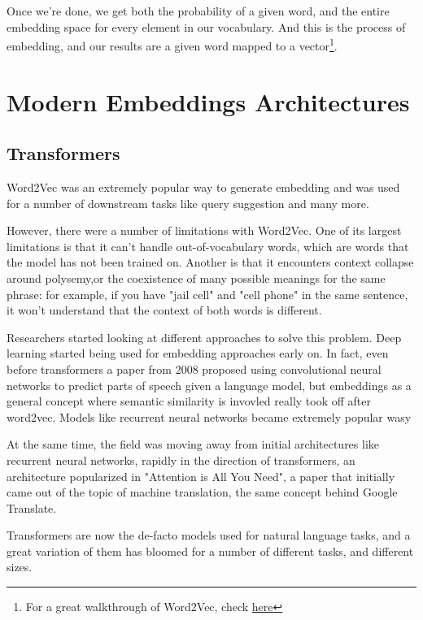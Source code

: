 \documentclass[draft, 11pt]{diazessay} %
\begin{document}
Once we're done, we get both the probability of a given word, and the entire embedding space for every element in our vocabulary. And this is the process of embedding, and our results are a given word mapped to a vector\footnote{For a great walkthrough of Word2Vec, check  \href{https://jalammar.github.io/illustrated-word2vec/}{here}}. 

\section{Modern Embeddings Architectures}

\subsection{Transformers}

Word2Vec was an extremely popular way to generate embedding and was used for a number of downstream tasks like query suggestion
\citep{gabin2023keyword} and many more. 

However, there were a number of limitations with Word2Vec. One of its largest limitations is that it can't handle out-of-vocabulary words, which are words that the model has not been trained on.  Another is that it encounters context collapse around polysemy,or the coexistence of many possible meanings for the same phrase: for example, if you have "jail cell" and "cell phone" in the same sentence, it won't understand that the context of both words is different. 

Researchers started looking at different approaches to solve this problem. Deep learning started being used for embedding approaches early on. In fact, even before transformers a paper from 2008 proposed using convolutional neural networks to predict parts of speech given a language model, but embeddings as a general concept where semantic similarity is invovled really took off after word2vec. Models like recurrent neural networks became extremely popular wasy 

At the same time, the field was moving away from initial architectures like recurrent neural networks, rapidly in the direction of transformers, an architecture popularized in "Attention is All You Need", a paper that initially came out of the topic of machine translation, the same concept behind Google Translate\citep{vaswani2017attention}. 

Transformers are now the de-facto models used for natural language tasks, and a great variation of them has bloomed for a number of different tasks, and different sizes. 
\end{document}
